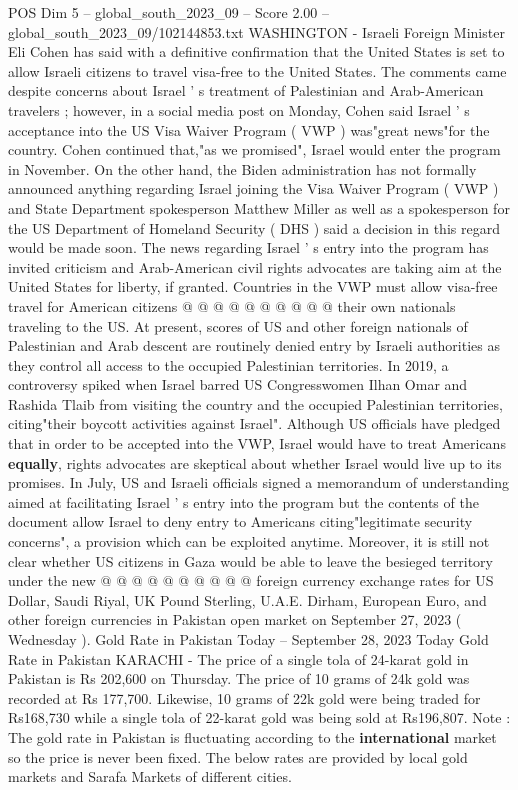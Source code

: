 \begin{textsample}{POS Dim 5 – global\_south\_2023\_09 – Score 2.00 – global\_south\_2023\_09/102144853.txt}  \label{ex:f5_pos_446}
WASHINGTON - Israeli Foreign Minister Eli Cohen has said with a definitive confirmation that the United States is set to allow Israeli citizens to travel visa-free to the United States.
The comments came despite concerns about Israel ' s treatment of Palestinian and Arab-American travelers ; however, in a social media post on Monday, Cohen said Israel ' s acceptance into the US Visa Waiver Program ( VWP ) was"great news"for the country.
Cohen continued that,"as we promised", Israel would enter the program in November.
On the other hand, the Biden administration has not formally announced anything regarding Israel joining the Visa Waiver Program ( VWP ) and State Department spokesperson Matthew Miller as well as a spokesperson for the US Department of Homeland Security ( DHS ) said a decision in this regard would be made soon.
The news regarding Israel ' s entry into the program has invited criticism and Arab-American civil rights advocates are taking aim at the United States for liberty, if granted.
Countries in the VWP must allow visa-free travel for American citizens @ @ @ @ @ @ @ @ @ @ their own nationals traveling to the US.
At present, scores of US and other foreign nationals of Palestinian and Arab descent are routinely denied entry by Israeli authorities as they control all access to the occupied Palestinian territories.
In 2019, a controversy spiked when Israel barred US Congresswomen Ilhan Omar and Rashida Tlaib from visiting the country and the occupied Palestinian territories, citing"their boycott activities against Israel".
Although US officials have pledged that in order to be accepted into the VWP, Israel would have to treat Americans \textbf{equally}, rights advocates are skeptical about whether Israel would live up to its promises.
In July, US and Israeli officials signed a memorandum of understanding aimed at facilitating Israel ' s entry into the program but the contents of the document allow Israel to deny entry to Americans citing"legitimate security concerns", a provision which can be exploited anytime.
Moreover, it is still not clear whether US citizens in Gaza would be able to leave the besieged territory under the new @ @ @ @ @ @ @ @ @ @ foreign currency exchange rates for US Dollar, Saudi Riyal, UK Pound Sterling, U.A.E.
Dirham, European Euro, and other foreign currencies in Pakistan open market on September 27, 2023 ( Wednesday ).
Gold Rate in Pakistan Today -- September 28, 2023 Today Gold Rate in Pakistan KARACHI - The price of a single tola of 24-karat gold in Pakistan is Rs 202,600 on Thursday.
The price of 10 grams of 24k gold was recorded at Rs 177,700.
Likewise, 10 grams of 22k gold were being traded for Rs168,730 while a single tola of 22-karat gold was being sold at Rs196,807.
Note : The gold rate in Pakistan is fluctuating according to the \textbf{international} market so the price is never been fixed.
The below rates are provided by local gold markets and Sarafa Markets of different cities.

\end{textsample}

